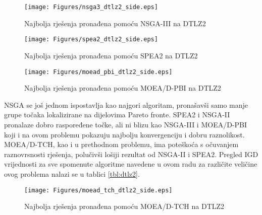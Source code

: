 \documentclass[times, utf8, zavrsni, numeric]{fer}
\begin{document}
\begin{figure}[htb]
\centering
\texttt{[image: Figures/nsga3\_dtlz2\_side.eps]}
\caption{Najbolja rješenja pronađena pomoću NSGA-III na DTLZ2}
\label{fig:nsgaiii_dtlz2}
\end{figure}

\begin{figure}[htb]
\centering
\texttt{[image: Figures/spea2\_dtlz2\_side.eps]}
\caption{Najbolja rješenja pronađena pomoću SPEA2 na DTLZ2}
\label{fig:spea2_dtlz2}
\end{figure}

\begin{figure}[htb]
\centering
\texttt{[image: Figures/moead\_pbi\_dtlz2\_side.eps]}
\caption{Najbolja rješenja pronađena pomoću MOEA/D-PBI na DTLZ2}
\label{fig:moeadpbi_dtlz2}
\end{figure}
NSGA se još jednom ispostavlja kao najgori algoritam, pronašavši samo manje grupe točaka lokalizirane na dijelovima Pareto fronte. SPEA2 i NSGA-II pronalaze dobro raspoređene točke, ali ni blizu kao NSGA-III i MOEA/D-PBI koji i na ovom problemu pokazuju najbolju konvergenciju i dobru raznolikost. MOEA/D-TCH, kao i u prethodnom problemu, ima poteškoća s očuvanjem raznovrsnosti rješenja, polučivši lošiji rezultat od NSGA-II i SPEA2. Pregled IGD vrijednosti za sve spomenute algoritme navedene u ovom radu za različite veličine ovog problema nalazi se u tablici \ref{tbl:dtlz2}.
\FloatBarrier	
\begin{figure}[htbp]
\centering
\texttt{[image: Figures/moead\_tch\_dtlz2\_side.eps]}
\caption{Najbolja rješenja pronađena pomoću MOEA/D-TCH na DTLZ2}
\label{fig:moeadtch_dtlz2}
\end{figure}
 
\end{document}
